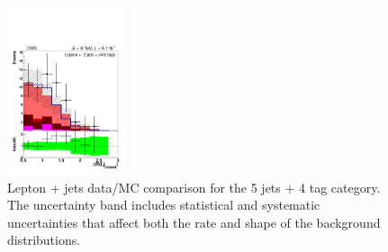 \begin{figure}[hbtp]
\begin{center}
   \includegraphics[width=0.31\textwidth]{Figures/Analysis_1_Diagrams/d2MCPlots_dr_between_lep_and_closest_jet_cut8_j5_tge4_Combined_HtWgt.pdf}
   \hspace{0.055\textwidth}
   \caption{Lepton + jets data/MC comparison for the 5 jets + 4 tag category.  The uncertainty band includes statistical and systematic uncertainties that affect both the rate and shape of the background distributions.}
   \label{fig:lj_input_5j_4t_part2}
 \end{center}
\end{figure}

%
%

\clearpage

